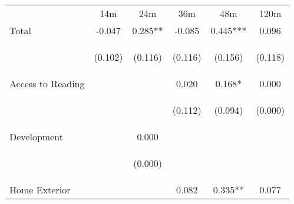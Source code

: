 \begin{tabular}{lccccc}
\hline \noalign{\smallskip} & 14m & 24m & 36m & 48m & 120m\\
\noalign{\smallskip}\hline \noalign{\smallskip}Total & -0.047 & 0.285** & -0.085 & 0.445*** & 0.096\\
 & \begin{footnotesize}(0.102)\end{footnotesize} & \begin{footnotesize}(0.116)\end{footnotesize} & \begin{footnotesize}(0.116)\end{footnotesize} & \begin{footnotesize}(0.156)\end{footnotesize} & \begin{footnotesize}(0.118)\end{footnotesize}\\
\noalign{\smallskip}Access to Reading &  &  & 0.020 & 0.168* & 0.000\\
 & \begin{footnotesize}\end{footnotesize} & \begin{footnotesize}\end{footnotesize} & \begin{footnotesize}(0.112)\end{footnotesize} & \begin{footnotesize}(0.094)\end{footnotesize} & \begin{footnotesize}(0.000)\end{footnotesize}\\
\noalign{\smallskip}Development &  & 0.000 &  &  & \\
 & \begin{footnotesize}\end{footnotesize} & \begin{footnotesize}(0.000)\end{footnotesize} & \begin{footnotesize}\end{footnotesize} & \begin{footnotesize}\end{footnotesize} & \begin{footnotesize}\end{footnotesize}\\
\noalign{\smallskip}Home Exterior &  &  & 0.082 & 0.335** & 0.077\\

\end{tabular}
